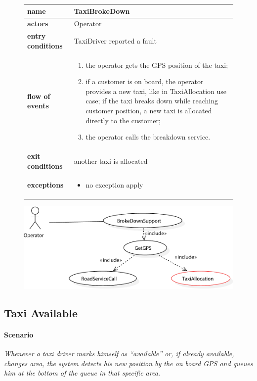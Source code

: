 \begin{figure}\begin{tabularx}{\textwidth}{ >{\bfseries}l X }\toprule%
	name				&	TaxiBrokeDown%
	\\ \midrule%
	actors				&	Operator%
	\\ \midrule%
	entry conditions	&	TaxiDriver reported a fault%
	\\ \midrule%
	flow of events		&	\begin{enumerate}%
		\item the operator gets the GPS position of the taxi;%
		\item if a customer is on board, the operator provides a new taxi, like in TaxiAllocation use case; if the taxi breaks down while reaching customer position, a new taxi is allocated directly to the customer;%
		\item the operator calls the breakdown service.%
	\end{enumerate} \\ \midrule%
	exit conditions		&	another taxi is allocated%
		\\ \midrule%
	exceptions			&	\begin{itemize}%
		\item no exception apply%
	\end{itemize}\\ \bottomrule%
\end{tabularx}\end{figure}


\begin{figure}%
	\includegraphics[width=\textwidth]{img/U_TaxiBrokeDown}%
\end{figure}
	

\subsection{Taxi Available}

\paragraph{Scenario}{\small\itshape Whenever a taxi driver marks himself as ``available'' or, if already available, changes area, the system detects his new position by the on board GPS and queues him at the bottom of the queue in that specific area.}


